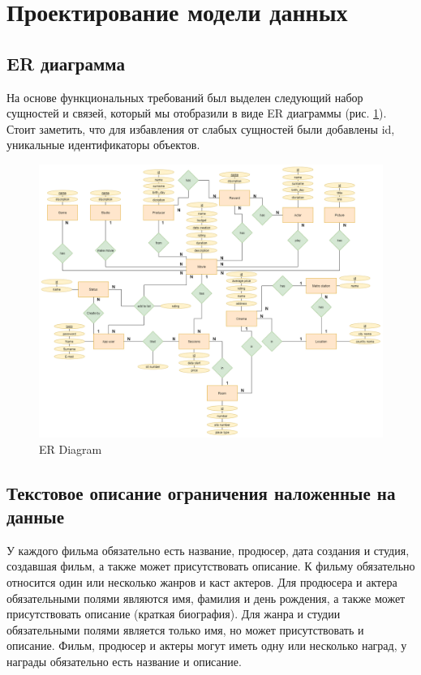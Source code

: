 \documentclass[a4paper,16pt]{article}
\begin{document}
\section{Проектирование модели данных}
\subsection{ER диаграмма}
На основе функциональных требований был выделен следующий набор сущностей и связей, который мы отобразили в виде ER диаграммы (рис. \ref{fig:ER}). Стоит заметить, что для избавления от слабых сущностей были добавлены id, уникальные идентификаторы объектов.
\begin{figure}[h]
    \centering
    \includegraphics[scale=0.28]{thisMoview.png}
    \caption{ER Diagram}
    \label{fig:ER}
\end{figure}
\subsection{Текстовое описание ограничения наложенные на данные}
У каждого фильма обязательно есть название, продюсер, дата создания и студия, создавшая фильм, а также может присутствовать описание. К фильму обязательно относится один или несколько жанров и каст актеров. Для продюсера и актера обязательными полями являются имя, фамилия и день рождения, а также может присутствовать описание (краткая биография). Для жанра и студии обязательными полями является только имя, но может присутствовать и описание. Фильм, продюсер и актеры могут иметь одну или несколько наград, у награды обязательно есть название и описание.
\end{document}
